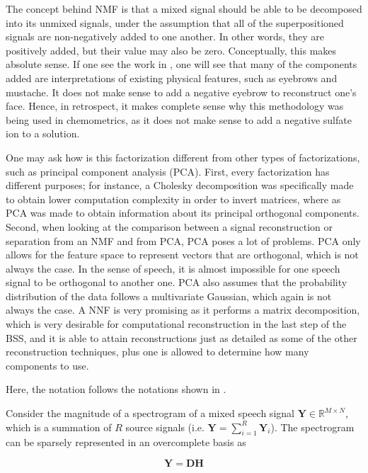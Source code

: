 The concept behind NMF is that a mixed signal should be able to be decomposed into its unmixed signals, under the assumption that all of the superpositioned signals are non-negatively added to one another. In other words, they are positively added, but their value may also be zero. Conceptually, this makes absolute sense. If one see the work in \cite{nmf1}, one will see that many of the components added are interpretations of existing physical features, such as eyebrows and mustache. It does not make sense to add a negative eyebrow to reconstruct one's face. Hence, in retrospect, it makes complete sense why this methodology was being used in chemometrics, as it does not make sense to add a negative sulfate ion to a solution.

One may ask how is this factorization different from other types of factorizations, such as principal component analysis (PCA). First, every factorization has different purposes; for instance, a Cholesky decomposition was specifically made to obtain lower computation complexity in order to invert matrices, where as PCA was made to obtain information about its principal orthogonal components. Second, when looking at the comparison between a signal reconstruction or separation from an NMF and from PCA, PCA poses a lot of problems. PCA only allows for the feature space to represent vectors that are orthogonal, which is not always the case. In the sense of speech, it is almost impossible for one speech signal to be orthogonal to another one. PCA also assumes that the probability distribution of the data follows a multivariate Gaussian, which again is not always the case. A NNF is very promising as it performs a matrix decomposition, which is very desirable for computational reconstruction in the last step of the BSS, and it is able to attain reconstructions just as detailed as some of the other reconstruction techniques, plus one is allowed to determine how many components to use.

Here, the notation follows the notations shown in \cite{singlechannel}.

Consider the magnitude of a spectrogram of a mixed speech signal $\bm{Y} \in \mathbb{R}^{M\times N}$, which is a summation of $R$ source signals (i.e. $\bm{Y} = \sum_{i=1}^{R} \bm{Y}_i$). The spectrogram can be sparsely represented in an overcomplete basis as

$$\bm{Y} = \bm{D} \bm{H}$$

